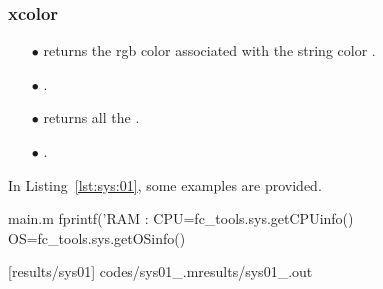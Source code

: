 

\subsubsection{xcolor}
\begin{itemize}
\item[$\bullet$]  returns the rgb color associated with the string color .
\item[$\bullet$]  .
\item[$\bullet$]  returns all the .
\item[$\bullet$]  .
\end{itemize}

In Listing~\ref{lst:sys:01}, some examples are provided.
\begin{filecontents*}{main.m}
fprintf('RAM : %
CPU=fc_tools.sys.getCPUinfo()
OS=fc_tools.sys.getOSinfo()
\end{filecontents*}
[results/sys01]
%
                      {codes/sys01_\fccmdname\fccmdversionabr.m}{results/sys01_\fccmdname\fccmdversionabr.out}
